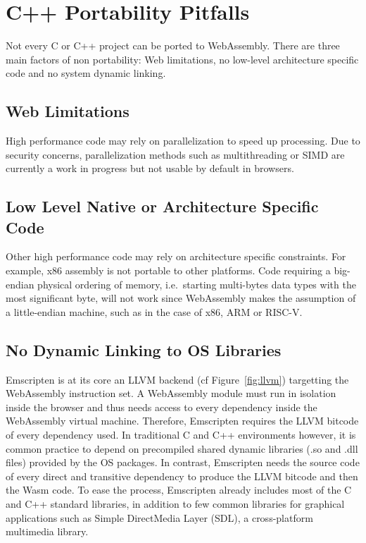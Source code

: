 \section{C++ Portability Pitfalls}%
\label{sec:cpp_pitfalls}

Not every C or C++ project can be ported to WebAssembly.
There are three main factors of non portability:
Web limitations, no low-level architecture specific code and no system dynamic linking.

\subsection{Web Limitations}%
\label{sub:web_limitations}

High performance code may rely on parallelization to speed up processing.
Due to security concerns, parallelization methods such as multithreading
or SIMD are currently a work in progress but not usable by default in browsers.

\subsection{Low Level Native or Architecture Specific Code}%
\label{sub:low_level_code}

Other high performance code may rely on architecture specific constraints.
For example, x86 assembly is not portable to other platforms.
Code requiring a big-endian physical ordering of memory,
i.e.\ starting multi-bytes data types with the most significant byte,
will not work since WebAssembly makes the assumption of a little-endian machine,
such as in the case of x86, ARM or RISC-V.

\subsection{No Dynamic Linking to OS Libraries}%
\label{sub:no_dynamic_linking}

Emscripten is at its core an LLVM backend (cf Figure~\ref{fig:llvm})
targetting the WebAssembly instruction set.
A WebAssembly module must run in isolation inside the browser
and thus needs access to every dependency inside the WebAssembly virtual machine.
Therefore, Emscripten requires the LLVM bitcode of every dependency used.
In traditional C and C++ environments however,
it is common practice to depend on precompiled
shared dynamic libraries (.so and .dll files) provided by the OS packages.
{In contrast, Emscripten needs the source code of every direct
and transitive dependency to produce the LLVM bitcode and then the Wasm code.}
To ease the process, Emscripten already includes most of the C and C++ standard libraries,
in addition to few common libraries for graphical applications such as
Simple DirectMedia Layer (SDL), a cross-platform multimedia library.

